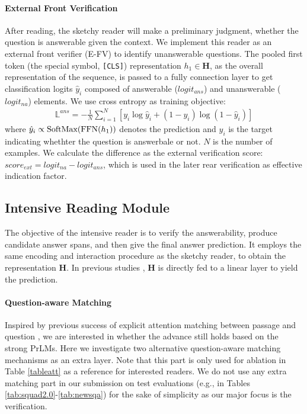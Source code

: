 \documentclass[letterpaper]{article} %
\begin{document}
\paragraph{External Front Verification}
After reading, the sketchy reader will make a preliminary judgment, whether the question is answerable given the context. We implement this reader as an external front verifier (E-FV) to identify unanswerable questions. The pooled first token (the special symbol, \texttt{[CLS]}) representation $h_1 \in \textbf{H}$, as the overall representation of the sequence, is passed to a fully connection layer to get classification logits $\hat{y}_{i}$ composed of answerable ($logit_{ans}$) and unanswerable ($logit_{na}$) elements. We use cross entropy as training objective: 
\begin{align}
\mathbb{L}^{ans} = -\frac{1}{N}\sum_{i=1}^{N}\left [y_{i}\log\hat{y}_{i} + (1-y_{i})\log(1-\hat{y}_{i} )\right ]
\end{align}
where $\hat{y}_{i} \propto \textup{SoftMax}(\textup{FFN}(h_1))$ denotes the prediction and $y_{i}$ is the target indicating whethter the question is answerbale or not. $N$ is the number of examples. We calculate the difference as the external verification score: $score_{ext} = logit_{na} - logit_{ans}$, which is used in the later rear verification as effective indication factor. 

\subsection{Intensive Reading Module}\label{sec:intensive}
The objective of the intensive reader is to verify the answerability, produce candidate answer spans, and then give the final answer prediction. It employs the same encoding and interaction procedure as the sketchy reader, to obtain the representation $\textbf{H}$. In previous studies \cite{devlin2018bert,yang2019xlnet,Lan2020ALBERT}, $\textbf{H}$ is directly fed to a linear layer to yield the prediction. 


\paragraph{Question-aware Matching}
Inspired by previous success of explicit attention matching between passage and question \cite{kadlec2016text,Dhingra2017Gated,Wang2017Gated,Seo2016Bidirectional}, we are interested in whether the advance still holds based on the strong PrLMs. Here we investigate two alternative question-aware matching mechanisms as an extra layer. Note that this part is only used for ablation in Table \ref{tableatt} as a reference for interested readers. We do not use any extra matching part in our submission on test evaluations (e.g., in Tables \ref{tab:squad2.0}-\ref{tab:newsqa}) for the sake of simplicity as our major focus is the verification.
\end{document}

